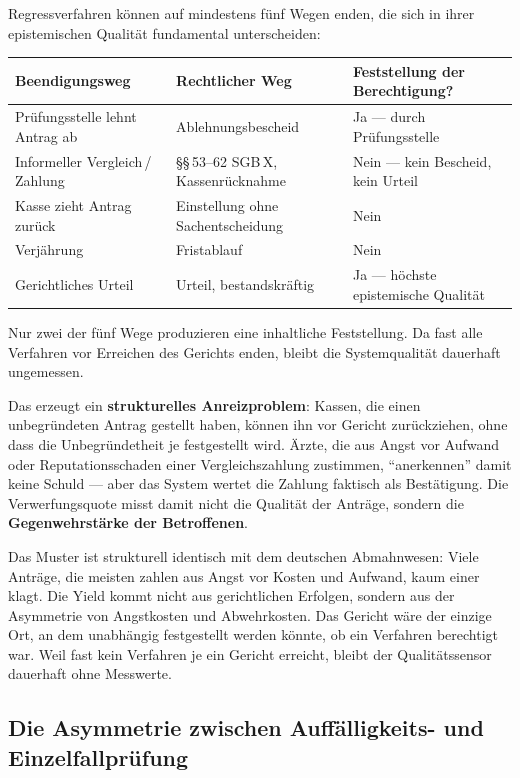 \documentclass{umbruch-position}
\begin{document}
Regressverfahren können auf mindestens fünf Wegen enden, die sich in ihrer epistemischen Qualität fundamental unterscheiden:

{\small
\begin{tabularx}{\textwidth}{X X X}
\toprule
\textbf{Beendigungsweg} & \textbf{Rechtlicher Weg} & \textbf{Feststellung der Berechtigung?} \\
\midrule
Prüfungsstelle lehnt Antrag ab & Ablehnungsbescheid & Ja --- durch Prüfungsstelle \\
Informeller Vergleich\,/\,Zahlung & \S\S\,53--62 SGB\,X, Kassenrücknahme & Nein --- kein Bescheid, kein Urteil \\
Kasse zieht Antrag zurück & Einstellung ohne Sachentscheidung & Nein \\
Verjährung & Fristablauf & Nein \\
Gerichtliches Urteil & Urteil, bestandskräftig & Ja --- höchste epistemische Qualität \\
\bottomrule
\end{tabularx}
}

Nur zwei der fünf Wege produzieren eine inhaltliche Feststellung. Da fast alle Verfahren vor Erreichen des Gerichts enden, bleibt die Systemqualität dauerhaft ungemessen.

Das erzeugt ein \textbf{strukturelles Anreizproblem}: Kassen, die einen unbegründeten Antrag gestellt haben, können ihn vor Gericht zurückziehen, ohne dass die Unbegründetheit je festgestellt wird. Ärzte, die aus Angst vor Aufwand oder Reputationsschaden einer Vergleichszahlung zustimmen, ``anerkennen'' damit keine Schuld --- aber das System wertet die Zahlung faktisch als Bestätigung. Die Verwerfungsquote misst damit nicht die Qualität der Anträge, sondern die \textbf{Gegenwehrstärke der Betroffenen}.

Das Muster ist strukturell identisch mit dem deutschen Abmahnwesen: Viele Anträge, die meisten zahlen aus Angst vor Kosten und Aufwand, kaum einer klagt. Die Yield kommt nicht aus gerichtlichen Erfolgen, sondern aus der Asymmetrie von Angstkosten und Abwehrkosten. Das Gericht wäre der einzige Ort, an dem unabhängig festgestellt werden könnte, ob ein Verfahren berechtigt war. Weil fast kein Verfahren je ein Gericht erreicht, bleibt der Qualitätssensor dauerhaft ohne Messwerte.

\subsection{Die Asymmetrie zwischen Auffälligkeits- und Einzelfallprüfung}
\end{document}

